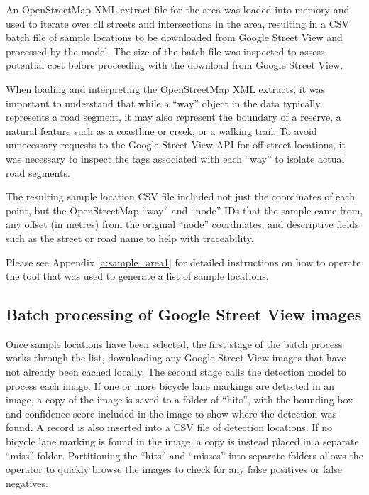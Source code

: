 \documentclass[11pt,twoside]{report}
\begin{document}
An OpenStreetMap XML extract file for the area was loaded into memory and used to iterate over all streets and intersections in the area, resulting in a CSV batch file of sample locations to be downloaded from Google Street View and processed by the model.  The size of the batch file was inspected to assess potential cost before proceeding with the download from Google Street View.

When loading and interpreting the OpenStreetMap XML extracts, it was important to understand that while a ``way'' object in the data typically represents a road segment, it may also represent the boundary of a reserve, a natural feature such as a coastline or creek, or a walking trail.  To avoid unnecessary requests to the Google Street View API for off-street locations, it was necessary to inspect the tags associated with each ``way'' to isolate actual road segments.

The resulting sample location CSV file included not just the coordinates of each point, but the OpenStreetMap ``way'' and ``node'' IDs that the sample came from, any offset (in metres) from the original ``node'' coordinates, and descriptive fields such as the street or road name to help with traceability.

Please see Appendix \ref{a:sample_area1} for detailed instructions on how to operate the tool that was used to generate a list of sample locations.

\subsection{Batch processing of Google Street View images}
\label{s:rq2b}

Once sample locations have been selected, the first stage of the batch process works through the list, downloading any Google Street View images that have not already been cached locally.  The second stage calls the detection model to process each image.  If one or more bicycle lane markings are detected in an image, a copy of the image is saved to a folder of ``hits'', with the bounding box and confidence score included in the image to show where the detection was found.  A record is also inserted into a CSV file of detection locations.  If no bicycle lane marking is found in the image, a copy is instead placed in a separate ``miss'' folder.  Partitioning the ``hits'' and ``misses'' into separate folders allows the operator to quickly browse the images to check for any false positives or false negatives.
\end{document}
